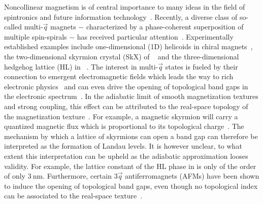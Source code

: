 \documentclass[
    aps,
    prl,
    twocolumn,
    floatfix,
    superscriptaddress
]{revtex4-2}
\begin{document}
Noncollinear magnetism is of central importance to many ideas in the field of spintronics and future information technology~\cite{Vedmedenko2020, Back2020}.
Recently, a diverse class of so-called multi-$\vec{q}$ magnets $-$ characterized by a phase-coherent superposition of multiple spin-spirals $-$ has received particular attention~\cite{Okubo2012, Takagi2018, Hirschberger2019, Fujishiro2019, Okumura2020}.
Experimentally established examples include one-dimensional (1D) helicoids in chiral magnets~\cite{Adams2012,Janoschek2013}, the two-dimensional skyrmion crystal (SkX) of ~\cite{Neubauer2009} and the three-dimensional hedgehog lattice (HL) in ~\cite{Tanigaki2015}.
The interest in multi-$\vec{q}$ states is fueled by their connection to emergent electromagnetic fields which leads the way to rich electronic physics~\cite{ Bliokh2005, Fujita2011}
and can even drive  the opening of topological band gaps in the electronic spectrum~\cite{Hamamoto2015, Goebel2017, Goebel2018}.
In the adiabatic limit of smooth magnetization textures and strong coupling, this effect can be attributed to the real-space topology of the magnetization texture~\cite{Bruno2004, EverschorSitte2014}.
For example, a magnetic skyrmion will carry a quantized magnetic flux which is proportional to its topological charge~\cite{Nagaosa2013}. 
The mechanism by which a lattice of skyrmions can open a band gap can therefore be interpreted as the formation of Landau levels.
It is however unclear, to what extent this interpretation can be upheld as the adiabatic approximation looses validity.
For example, the lattice constant of the HL phase in  is only of the order of only $\SI{3}{\nano\meter}$.
Furthermore, certain $3\vec{q}$ antiferromagnets (AFMs) have been shown to induce the opening of topological band gaps, even though no topological index can be associated to the real-space texture~\cite{Ndiaye2019, Feng2020}.
\end{document}
